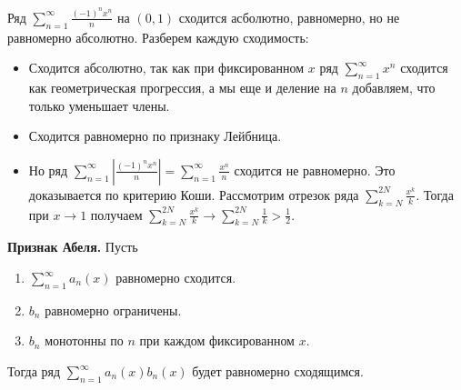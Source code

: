 \begin{example}
    Ряд $\sum\limits_{n = 1}^\infty \frac{(-1)^nx^n}{n}$ на $(0, 1)$ сходится асболютно, равномерно, но не равномерно абсолютно.
    Разберем каждую сходимость: \begin{itemize}
        \item Сходится абсолютно, так как при фиксированном $x$ ряд $\sum\limits_{n=1}^\infty x^n$ сходится как геометрическая прогрессия, а мы еще и деление на $n$ добавляем, что только уменьшает члены.
        \item Сходится равномерно по признаку Лейбница.
        \item Но ряд $\sum\limits_{n = 1}^\infty \left|\frac{(-1)^nx^n}{n}\right| = \sum\limits_{n = 1}^\infty \frac{x^n}{n}$ сходится не равномерно.
        Это доказывается по критерию Коши. 
        Рассмотрим отрезок ряда $\sum\limits_{k = N}^{2N} \frac{x^k}{k}$.
        Тогда при $x \to 1$ получаем $\sum\limits_{k = N}^{2N} \frac{x^k}{k} \to \sum\limits_{k = N}^{2N} \frac{1}{k} > \frac{1}{2}$.
    \end{itemize}
\end{example}

\vspace*{7mm}

\textbf{Признак Абеля.} Пусть \begin{enumerate}
    \item $\sum\limits_{n = 1}^\infty a_n(x)$ равномерно сходится.
    \item $b_n$ равномерно ограничены.
    \item $b_n$ монотонны по $n$ при каждом фиксированном $x$.
\end{enumerate}
Тогда ряд $\sum\limits_{n = 1}^\infty a_n(x)b_n(x)$ будет равномерно сходящимся.

